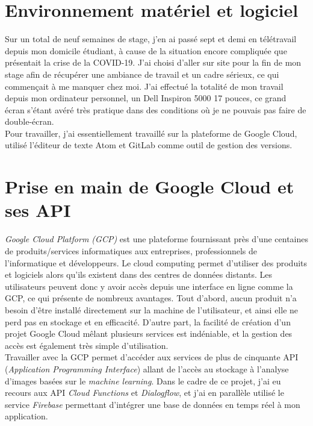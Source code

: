 \documentclass[stage2a]{tnreport} %
\begin{document}
\section{Environnement matériel et logiciel}

Sur un total de neuf semaines de stage, j'en ai passé sept et demi en télétravail depuis mon domicile étudiant, à cause de la situation encore compliquée que présentait la crise de la COVID-19. J'ai choisi d'aller sur site pour la fin de mon stage afin de récupérer une ambiance de travail et un cadre sérieux, ce qui commençait à me manquer chez moi. J'ai effectué la totalité de mon travail depuis mon ordinateur personnel, un Dell Inspiron 5000 17 pouces, ce grand écran s'étant avéré très pratique dans des conditions où je ne pouvais pas faire de double-écran. \\

Pour travailler, j'ai essentiellement travaillé sur la plateforme de Google Cloud, utilisé l'éditeur de texte Atom et GitLab comme outil de gestion des versions. 

\section{Prise en main de Google Cloud et ses API}

\emph{Google Cloud Platform (GCP)} est une plateforme fournissant près d'une centaines de produits/services informatiques aux entreprises, professionnels de l'informatique et développeurs. Le cloud computing permet d'utiliser des produits et logiciels alors qu'ils existent dans des centres de données distants. Les utilisateurs peuvent donc y avoir accès depuis une interface en ligne comme la GCP, ce qui présente de nombreux avantages. Tout d'abord, aucun produit n'a besoin d'être installé directement sur la machine de l'utilisateur, et ainsi elle ne perd pas en stockage et en efficacité. D'autre part, la facilité de création d'un projet Google Cloud mêlant plusieurs services est indéniable, et la gestion des accès est également très simple d'utilisation.\\

Travailler avec la GCP permet d'accéder aux services de plus de cinquante API (\emph{Application Programming Interface}) allant de l'accès au stockage à l'analyse d'images basées sur le \emph{machine learning}. Dans le cadre de ce projet, j'ai eu recours aux API \emph{Cloud Functions} et \emph{Dialogflow}, et j'ai en parallèle utilisé le service \emph{Firebase} permettant d'intégrer une base de données en temps réel à mon application. 
\end{document}

